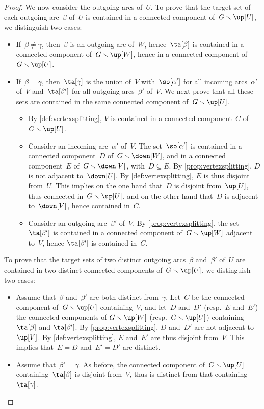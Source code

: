 \documentclass{amsart}
\theoremstyle{definition}
\newcommand{\ssm}{\smallsetminus} %
\begin{document}
\begin{proof}
  We now consider the outgoing arcs of~$U$.
  To prove that the target set of each outgoing arc~$\beta$ of~$U$ is contained in a connected component of~$G \ssm \up[U]$, we distinguish two cases:
  \begin{itemize}
    \item If~$\beta \ne \gamma$, then~$\beta$ is an outgoing arc of~$W$, hence~$\ta[\beta]$ is contained in a connected component of~$G \ssm \up[W]$, hence in a connected component of~$G \ssm \up[U]$.
    \item If~$\beta = \gamma$, then~$\ta[\gamma]$ is the union of~$V$ with~$\so[\alpha']$ for all incoming arcs~$\alpha'$ of~$V$ and~$\ta[\beta']$ for all outgoing arcs~$\beta'$ of~$V$. We next prove that all these sets are contained in the same connected component of~$G \ssm \up[U]$.
    \begin{itemize}
      \item By \cref{def:vertexsplitting}, $V$ is contained in a connected component~$C$ of~$G \ssm \up[U]$. 
      \item Consider an incoming arc~$\alpha'$ of~$V$. The set~$\so[\alpha']$ is contained in a connected component~$D$ of~$G \ssm \down[W]$, and in a connected component~$E$ of~$G \ssm \down[V]$, with~$D \subseteq E$. By \cref{prop:vertexsplitting}, $D$ is not adjacent to~$\down[U]$. By \cref{def:vertexsplitting}, $E$ is thus disjoint from~$U$. This implies on the one hand that~$D$ is disjoint from~$\up[U]$, thus connected in~$G \ssm \up[U]$, and on the other hand that~$D$ is adjacent to~$\down[V]$, hence contained in~$C$. 
      \item Consider an outgoing arc~$\beta'$ of~$V$. By \cref{prop:vertexsplitting}, the set $\ta[\beta']$ is contained in a connected component of~$G \ssm \up[W]$ adjacent to~$V$, hence $\ta[\beta']$ is contained in~$C$.
    \end{itemize}
  \end{itemize}
  To prove that the target sets of two distinct outgoing arcs~$\beta$ and~$\beta'$ of~$U$ are contained in two distinct connected components of~$G \ssm \up[U]$, we distinguish two cases:
  \begin{itemize}
  \item Assume that~$\beta$ and~$\beta'$ are both distinct from~$\gamma$. Let~$C$ be the connected component of~$G \ssm \up[U]$ containing~$V$, and let~$D$ and~$D'$ (resp.~$E$ and~$E'$) the connected components of $G \ssm \up[W]$ (resp.~$G \ssm \up[U]$) containing~$\ta[\beta]$ and $\ta[\beta']$. By \cref{prop:vertexsplitting}, $D$ and~$D'$ are not adjacent to~$\up[V]$. By \cref{def:vertexsplitting}, $E$ and~$E'$ are thus disjoint from~$V$. This implies that~$E = D$ and~$E' = D'$ are distinct.
  \item Assume that~$\beta' = \gamma$. As before, the connected component of~$G \ssm \up[U]$ containing~$\ta[\beta]$ is disjoint from~$V$, thus is distinct from that containing~$\ta[\gamma]$.
  \qedhere
  \end{itemize}
\end{proof}
\end{document}
